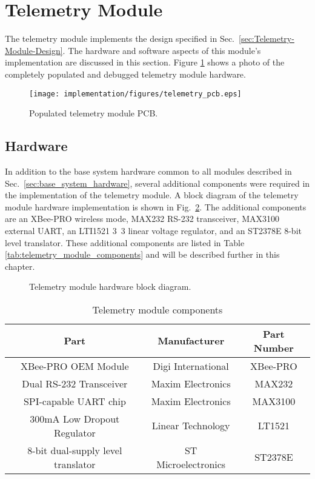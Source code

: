 \section{Telemetry Module}

The telemetry module implements the design specified in Sec.\ \ref{sec:Telemetry-Module-Design}. The hardware and software aspects of this module's implementation are discussed in this section. Figure \ref{fig:telemetry_pcb} shows a photo of the completely populated and debugged telemetry module hardware.

\begin{figure}[H]
\centering
\texttt{[image: implementation/figures/telemetry\_pcb.eps]}
\caption{Populated telemetry module PCB.}\label{fig:telemetry_pcb}
\end{figure}

\subsection{Hardware}

In addition to the base system hardware common to all modules described in Sec.\ \ref{sec:base_system_hardware}, several additional components were required in the implementation of the telemetry module. A block diagram of the telemetry module hardware implementation is shown in Fig.\ \ref{fig:telemetry_hardware_block}. The additional components are an XBee-PRO wireless mode, MAX232 RS-232 transceiver, MAX3100 external UART, an LTI1521 \unit{3.3}{\volt} linear voltage regulator, and an ST2378E 8-bit level translator. These additional components are listed in Table \ref{tab:telemetry_module_components} and will be described further in this chapter.

\begin{figure}[H]
\centering

\caption{Telemetry module hardware block diagram.\label{fig:telemetry_hardware_block}}
\end{figure}

\begin{table}[H]
  \caption{Telemetry module components\label{tab:telmetry_module_components}}
  \centering
    \begin{tabular}{|c|c|c|}
      \hline 
      Part & Manufacturer & Part Number\tabularnewline
      \hline
      \hline
      XBee-PRO OEM Module & Digi International & XBee-PRO\tabularnewline
      \hline 
      Dual RS-232 Transceiver & Maxim Electronics & MAX232\tabularnewline
      \hline 
      SPI-capable UART chip & Maxim Electronics & MAX3100\tabularnewline
      \hline 
      300mA Low Dropout Regulator & Linear Technology & LT1521\tabularnewline
      \hline
      8-bit dual-supply level translator & ST Microelectronics & ST2378E\tabularnewline
      \hline
    \end{tabular}
\end{table}

